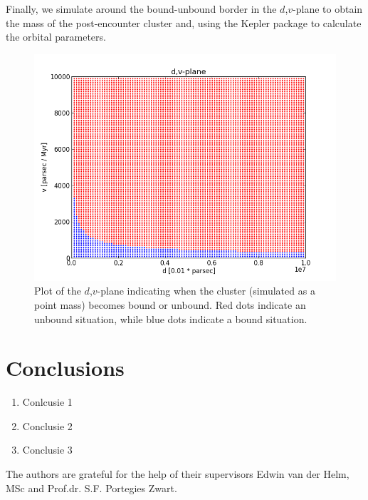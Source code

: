 \documentclass{aa}
\begin{document}
Finally, we simulate around the bound-unbound border in the $d$,$v$-plane to obtain the mass of the post-encounter cluster and, using the Kepler package \citep{REPLACE} to calculate the orbital parameters.
   \begin{figure}
   \centering
   \includegraphics[width=\hsize]{img/dv_plot.png}
      \caption{Plot of the $d$,$v$-plane indicating when the cluster (simulated as a point mass) becomes bound or unbound.
      		   Red dots indicate an unbound situation, while blue dots indicate a bound situation.
              }
         \label{fig:dvplane}
   \end{figure}

\section{Conclusions}

   \begin{enumerate}
      \item Conlcusie 1
      \item Conclusie 2
      \item Conclusie 3
   \end{enumerate}

\begin{acknowledgements}
      The authors are grateful for the help of their supervisors
      Edwin van der Helm, MSc and Prof.dr. S.F. Portegies Zwart.
\end{acknowledgements}



 
 
\end{document}
